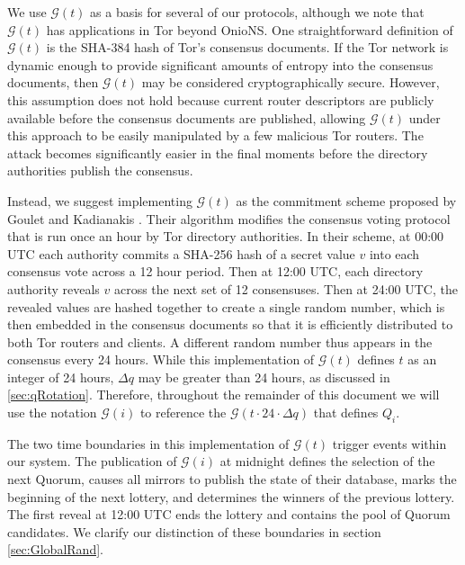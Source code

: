 \documentclass[USenglish,oneside,twocolumn]{article}
\begin{document}
We use $ \mathcal{G}(t) $ as a basis for several of our protocols, although we note that $ \mathcal{G}(t) $ has applications in Tor beyond OnioNS. One straightforward definition of $ \mathcal{G}(t) $ is the SHA-384 hash of Tor's consensus documents. If the Tor network is dynamic enough to provide significant amounts of entropy into the consensus documents, then $ \mathcal{G}(t) $ may be considered cryptographically secure. However, this assumption does not hold because current router descriptors are publicly available before the consensus documents are published, allowing $ \mathcal{G}(t) $ under this approach to be easily manipulated by a few malicious Tor routers. The attack becomes significantly easier in the final moments before the directory authorities publish the consensus.

Instead, we suggest implementing $ \mathcal{G}(t) $ as the commitment scheme proposed by Goulet and Kadianakis \cite{GouletCommitReveal}. Their algorithm modifies the consensus voting protocol that is run once an hour by Tor directory authorities. In their scheme, at 00:00 UTC each authority commits a SHA-256 hash of a secret value $ v $ into each consensus vote across a 12 hour period. Then at 12:00 UTC, each directory authority reveals $ v $ across the next set of 12 consensuses. Then at 24:00 UTC, the revealed values are hashed together to create a single random number, which is then embedded in the consensus documents so that it is efficiently distributed to both Tor routers and clients. A different random number thus appears in the consensus every 24 hours. While this implementation of $ \mathcal{G}(t) $ defines $ t $ as an integer of 24 hours, $ \Delta q $ may be greater than 24 hours, as discussed in \ref{sec:qRotation}. Therefore, throughout the remainder of this document we will use the notation $ \mathcal{G}(i) $ to reference the $ \mathcal{G}(t \cdot 24 \cdot \Delta q) $ that defines $ Q_{i} $.


The two time boundaries in this implementation of $ \mathcal{G}(t) $ trigger events within our system. The publication of $ \mathcal{G}(i) $ at midnight defines the selection of the next Quorum, causes all mirrors to publish the state of their database, marks the beginning of the next lottery, and determines the winners of the previous lottery. The first reveal at 12:00 UTC ends the lottery and contains the pool of Quorum candidates. We clarify our distinction of these boundaries in section \ref{sec:GlobalRand}. 
\end{document}
